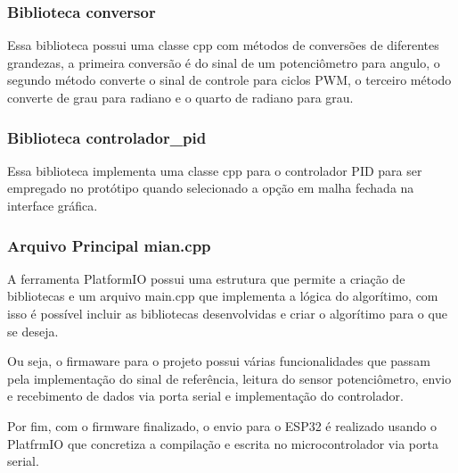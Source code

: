 \subsubsection{Biblioteca conversor}


Essa biblioteca possui uma classe cpp com métodos de conversões de diferentes grandezas, a primeira conversão é do sinal de um potenciômetro para angulo, o segundo método converte o sinal de controle para ciclos PWM, o terceiro método converte de grau para radiano e o quarto de radiano para grau.

\subsubsection{Biblioteca controlador\_pid}

Essa biblioteca implementa uma classe cpp para o controlador PID para ser empregado no protótipo quando selecionado a opção em malha fechada na interface gráfica.


\subsubsection{Arquivo Principal mian.cpp}

A ferramenta PlatformIO possui uma estrutura que permite a criação de bibliotecas e um arquivo main.cpp que implementa a lógica do algorítimo, com isso é possível incluir as bibliotecas desenvolvidas e criar o algorítimo para o que se deseja.


Ou seja, o firmaware para o projeto possui várias funcionalidades que passam pela implementação do sinal de referência, leitura do sensor potenciômetro, envio e recebimento de dados via porta serial e implementação do controlador.

Por fim, com o firmware finalizado, o envio para o ESP32 é realizado usando o PlatfrmIO que concretiza a compilação e escrita no microcontrolador via porta serial.
